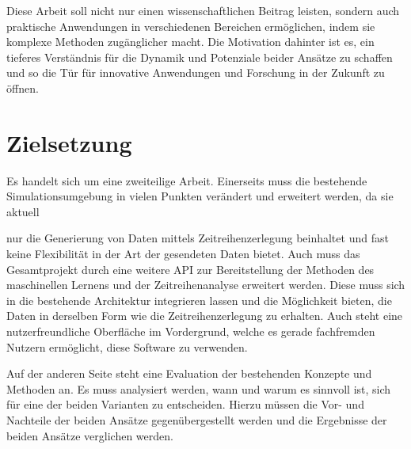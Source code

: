 Diese Arbeit soll nicht nur einen wissenschaftlichen Beitrag leisten, sondern auch praktische Anwendungen in verschiedenen Bereichen ermöglichen, indem sie komplexe Methoden zugänglicher macht. Die Motivation dahinter ist es, 
ein tieferes Verständnis für die Dynamik und Potenziale beider Ansätze zu schaffen und so die Tür für innovative Anwendungen und Forschung in der Zukunft zu öffnen.

\section{Zielsetzung}
Es handelt sich um eine zweiteilige Arbeit. Einerseits muss die bestehende Simulationsumgebung in vielen Punkten verändert und erweitert werden, da sie aktuell

nur die Generierung von Daten mittels Zeitreihenzerlegung beinhaltet und fast keine Flexibilität in der Art der gesendeten Daten bietet. Auch muss das Gesamtprojekt durch eine weitere \acf{API} zur Bereitstellung der 
Methoden des maschinellen Lernens und der Zeitreihenanalyse erweitert werden. Diese muss sich in die bestehende Architektur integrieren lassen und die Möglichkeit bieten, die Daten in derselben Form wie die Zeitreihenzerlegung 
zu erhalten. Auch steht eine nutzerfreundliche Oberfläche im Vordergrund, welche es gerade fachfremden Nutzern ermöglicht, diese Software zu verwenden.

Auf der anderen Seite steht eine Evaluation der bestehenden Konzepte und Methoden an. Es muss analysiert werden, wann und warum es sinnvoll ist, sich für eine der beiden Varianten zu entscheiden. Hierzu müssen die Vor- 
und Nachteile der beiden Ansätze gegenübergestellt werden und die Ergebnisse der beiden Ansätze verglichen werden.
